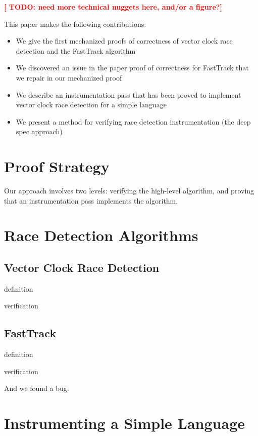 \documentclass[preprint, 10pt]{sigplanconf}
\newcommand{\TODO}[1]{\textbf{\textcolor{red}{[ TODO: #1]}}}
\begin{document}
\TODO{need more technical nuggets here, and/or a figure?}

This paper makes the following contributions:

\begin{itemize}
\item We give the first mechanized proofs of correctness of vector clock race detection and the FastTrack algorithm
\item We discovered an issue in the paper proof of correctness for FastTrack that we repair in our mechanized proof
\item We describe an instrumentation pass that has been proved to implement vector clock race detection for a simple language
\item We present a method for verifying race detection instrumentation (the deep spec approach)
\end{itemize}

\section{Proof Strategy}
Our approach involves two levels: verifying the high-level algorithm, and proving that an instrumentation pass implements the algorithm.

\section{Race Detection Algorithms}
\subsection{Vector Clock Race Detection}
definition

verification

\subsection{FastTrack}
definition

verification

And we found a bug.

\section{Instrumenting a Simple Language}
\end{document}
